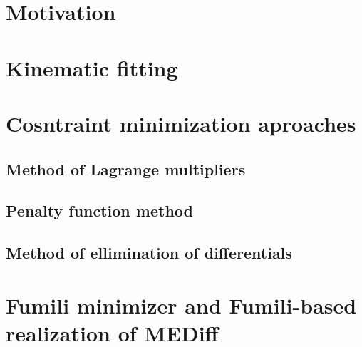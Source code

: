 \documentclass{webofc}
\begin{document}

%



\section{Motivation}
\section{Kinematic fitting}
\section{Cosntraint minimization aproaches}
  \subsection{Method of Lagrange multipliers}
  \subsection{Penalty function method}
  \subsection{Method of ellimination of differentials}
%     
\section{Fumili minimizer and Fumili-based realization of MEDiff}
\end{document}
